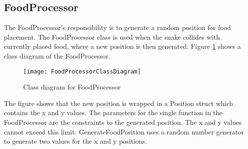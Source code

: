 \subsection{FoodProcessor}
	The FoodProcessor's responsibility is to generate a random position for food placement. The FoodProcessor class is used when the snake collides with currently placed food, where a new position is then generated. Figure \ref{fig:classFood} shows a class diagram of the FoodProcessor.

		\begin{figure}[H]
			\centering
			\texttt{[image: FoodProcessorClassDiagram]}
			\caption{Class diagram for FoodProcessor}
			\label{fig:classFood}
		\end{figure}
		
	The figure shows that the new position is wrapped in a Position struct which contains the x and y values. The parameters for the single function in the FoodProcessor are the constraints to the generated position. The x and y values cannot exceed this limit. GenerateFoodPosition uses a random number generator to generate two values for the x and y positions.	